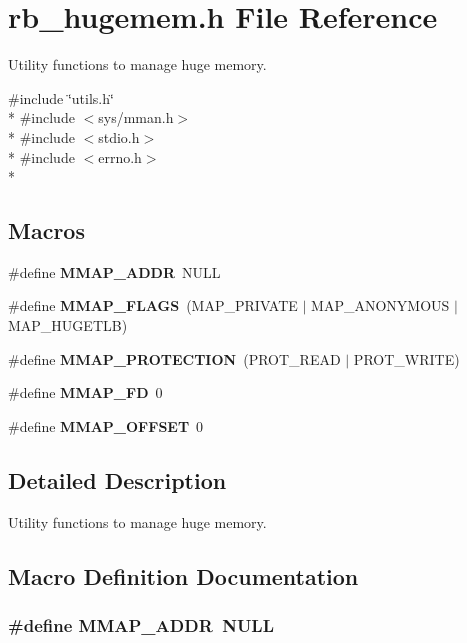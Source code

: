 \section{rb\+\_\+hugemem.\+h File Reference}
\label{rb__hugemem_8h}


Utility functions to manage huge memory.  


{\ttfamily \#include \char`\"{}utils.\+h\char`\"{}}\\*
{\ttfamily \#include $<$sys/mman.\+h$>$}\\*
{\ttfamily \#include $<$stdio.\+h$>$}\\*
{\ttfamily \#include $<$errno.\+h$>$}\\*
\subsection*{Macros}
\begin{DoxyCompactItemize}
\item 
\#define {\bf M\+M\+A\+P\+\_\+\+A\+D\+D\+R}~N\+U\+L\+L
\item 
\#define {\bf M\+M\+A\+P\+\_\+\+F\+L\+A\+G\+S}~(M\+A\+P\+\_\+\+P\+R\+I\+V\+A\+T\+E $\vert$ M\+A\+P\+\_\+\+A\+N\+O\+N\+Y\+M\+O\+U\+S $\vert$ M\+A\+P\+\_\+\+H\+U\+G\+E\+T\+L\+B)
\item 
\#define {\bf M\+M\+A\+P\+\_\+\+P\+R\+O\+T\+E\+C\+T\+I\+O\+N}~(P\+R\+O\+T\+\_\+\+R\+E\+A\+D $\vert$ P\+R\+O\+T\+\_\+\+W\+R\+I\+T\+E)
\item 
\#define {\bf M\+M\+A\+P\+\_\+\+F\+D}~0
\item 
\#define {\bf M\+M\+A\+P\+\_\+\+O\+F\+F\+S\+E\+T}~0
\end{DoxyCompactItemize}


\subsection{Detailed Description}
Utility functions to manage huge memory. 



\subsection{Macro Definition Documentation}
\subsubsection[{M\+M\+A\+P\+\_\+\+A\+D\+D\+R}]{\setlength{\rightskip}{0pt plus 5cm}\#define M\+M\+A\+P\+\_\+\+A\+D\+D\+R~N\+U\+L\+L}\label{rb__hugemem_8h_a828b7a9871bbaf6f63f4f8db3719af87}
